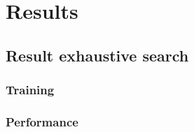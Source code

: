 \clearpage
\chapter{Results}

\section{Result exhaustive search}
    
    \subsection{Training}
    
        
        
    \subsection{Performance}
        
